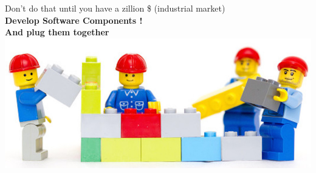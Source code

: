 \begin{frame}
\begin{columns}
\begin{column}[t]{.5\textwidth}
      \alert{Don't do that} until you have a zillion \$ (industrial market) \\[1em]
      \alert{\textbf{Develop Software Components !}} \\
      \alert{\textbf{And plug them together}} \\
      \includegraphics[width=.5\textwidth]{images/lego2.jpg}
    \end{column}
  \end{columns}
\end{frame}


